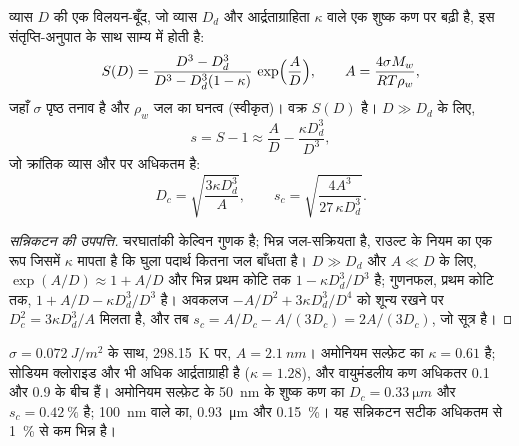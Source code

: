 \begin{proposition}[कोहलर वक्र]\label{prop:b2:atmospheric-thermodynamics:kohler}
व्यास $D$ की एक विलयन-बूँद, जो व्यास $D_d$ और आर्द्रताग्राहिता
$\kappa$ वाले एक शुष्क कण पर बढ़ी है, इस संतृप्ति-अनुपात के साथ साम्य में होती है:
\[
  S(D) = \frac{D^3 - D_d^3}{D^3 - D_d^3(1 - \kappa)}\,\exp\Bigl(\frac{A}{D}\Bigr), \qquad
  A = \frac{4\sigma M_w}{R T\rho_w},
\]
जहाँ $\sigma$ पृष्ठ तनाव है और $\rho_w$ जल का घनत्व (स्वीकृत)। वक्र $S(D)$
\emph{} है। $D \gg D_d$ के लिए,
\[
  s = S - 1 \approx \frac{A}{D} - \frac{\kappa D_d^3}{D^3},
\]
जो क्रांतिक व्यास और  पर अधिकतम है:
\[
  D_c = \sqrt{\frac{3\kappa D_d^3}{A}}, \qquad s_c = \sqrt{\frac{4A^3}{27\,\kappa D_d^3}} .
\]
\end{proposition}

\begin{proof}[सन्निकटन की उपपत्ति]
चरघातांकी केल्विन गुणक है; भिन्न जल-सक्रियता है, राउल्ट के नियम का एक रूप
जिसमें $\kappa$ मापता है कि घुला पदार्थ कितना जल बाँधता है। $D \gg D_d$ और
$A \ll D$ के लिए, $\exp(A/D) \approx 1 + A/D$ और भिन्न प्रथम कोटि तक $1 - \kappa D_d^3/D^3$ है;
गुणनफल, प्रथम कोटि तक, $1 + A/D - \kappa D_d^3/D^3$ है। अवकलज
$-A/D^2 + 3\kappa D_d^3/D^4$ को शून्य रखने पर $D_c^2 = 3\kappa D_d^3/A$ मिलता है, और तब $s_c = A/D_c -
A/(3D_c) = 2A/(3D_c)$, जो सूत्र है।
\end{proof}

$\sigma = \qty{0.072}{J/m^2}$ के साथ, \qty{298.15}{K} पर, $A = \qty{2.1}{nm}$। अमोनियम सल्फ़ेट का
$\kappa = 0.61$ है; सोडियम क्लोराइड और भी अधिक आर्द्रताग्राही है ($\kappa = 1.28$), और वायुमंडलीय कण अधिकतर 0.1 और 0.9 के बीच हैं।
अमोनियम सल्फ़ेट के \qty{50}{nm} के शुष्क कण का $D_c = \qty{0.33}{\micro m}$ और $s_c =
\qty{0.42}{\percent}$ है; \qty{100}{nm} वाले का, \qty{0.93}{\micro m} और \qty{0.15}{\percent}। यह
सन्निकटन सटीक अधिकतम से \qty{1}{\percent} से कम भिन्न है।

